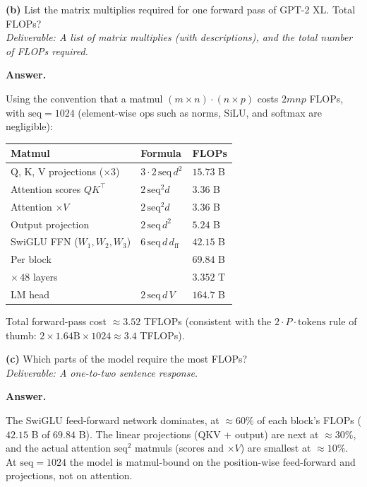 \documentclass[11pt]{article}
\newenvironment{answer}%
  {\par\noindent\textbf{Answer.}\par\vspace{0.25em}\begingroup\color{black!85}}%
  {\endgroup\par\vspace{1em}}
\begin{document}
\textbf{(b)} List the matrix multiplies required for one forward pass of GPT-2 XL. Total FLOPs? \\
\emph{Deliverable: A list of matrix multiplies (with descriptions), and the total number of FLOPs required.}
\begin{answer}
Using the convention that a matmul $(m\times n)\cdot(n\times p)$ costs $2mnp$ FLOPs, with $\text{seq}=1024$ (element-wise ops such as norms, SiLU, and softmax are negligible):

\begin{center}
\begin{tabular}{lll}
\toprule
Matmul & Formula & FLOPs \\
\midrule
Q, K, V projections ($\times 3$) & $3\cdot 2\,\text{seq}\,d^2$ & $15.73$ B \\
Attention scores $QK^\top$ & $2\,\text{seq}^2 d$ & $3.36$ B \\
Attention $\times V$ & $2\,\text{seq}^2 d$ & $3.36$ B \\
Output projection & $2\,\text{seq}\,d^2$ & $5.24$ B \\
SwiGLU FFN ($W_1,W_2,W_3$) & $6\,\text{seq}\,d\,d_{\text{ff}}$ & $42.15$ B \\
\midrule
Per block & & $69.84$ B \\
$\times\, 48$ layers & & $3.352$ T \\
LM head & $2\,\text{seq}\,d\,V$ & $164.7$ B \\
\bottomrule
\end{tabular}
\end{center}

Total forward-pass cost $\approx 3.52$ TFLOPs (consistent with the $2 \cdot P \cdot \text{tokens}$ rule of thumb: $2 \times 1.64\text{B} \times 1024 \approx 3.4$ TFLOPs).
\end{answer}

\textbf{(c)} Which parts of the model require the most FLOPs? \\
\emph{Deliverable: A one-to-two sentence response.}
\begin{answer}
The SwiGLU feed-forward network dominates, at $\approx 60\%$ of each block's FLOPs ($42.15$ B of $69.84$ B). The linear projections (QKV + output) are next at $\approx 30\%$, and the actual attention $\text{seq}^2$ matmuls (scores and $\times V$) are smallest at $\approx 10\%$. At $\text{seq}=1024$ the model is matmul-bound on the position-wise feed-forward and projections, not on attention.
\end{answer}
\end{document}
